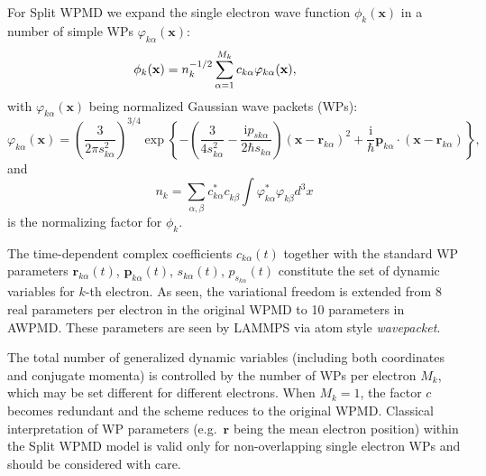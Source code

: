 \documentclass[a4paper,12pt]{article}
\begin{document}
For Split WPMD we expand the single electron wave function $\phi_k(\mathbf{x})$
in a number of simple WPs $\varphi_{k\alpha}(\mathbf{x})$:
\begin{equation}\label{WPdef}
\hspace*{-30pt}
\phi_k(\mathbf{x})
= n_k^{-1/2}\sum_{\alpha=1}^{M_k} c_{k\alpha} \varphi_{k\alpha}(\mathbf{x}),
\end{equation}
with $\varphi_{k\alpha}(\mathbf{x})$ being normalized Gaussian wave packets (WPs):
\begin{equation}
\varphi_{k\alpha}(\mathbf{x}) = \left( \frac{3}{2\pi s_{k\alpha}^2} \right)^{3/4}
\exp \left\{
- \left(\frac{3}{4s_{k\alpha}^2} - \frac{\mathrm{i}{p_{sk\alpha}}}{2\hbar s_{k\alpha}} \right)
(\mathbf{x}-\mathbf{r}_{k\alpha})^2 + \frac{\mathrm{i}}{\hbar}{\mathbf{p}_{k\alpha}} \cdot (\mathbf{x}-\mathbf{r}_{k\alpha})
\right\},
\end{equation}
and
\begin{equation}
n_k=\sum_{\alpha,\beta} c^*_{k\alpha}
c^{}_{k\beta}\int\varphi^*_{k\alpha}\varphi^{}_{k\beta}d^3x
\end{equation}
is the normalizing factor for $\phi_k$.

The time-dependent complex coefficients $c_{k\alpha}(t)$
together with the standard WP parameters $\mathbf{r}_{k\alpha}(t)$,
$\mathbf{p}_{k\alpha}(t)$, $s_{k\alpha}(t)$, $p_{s_{k\alpha}}(t)$ constitute
the set of dynamic variables for $k$-th electron. As seen,  the variational freedom is extended from 8 real parameters per electron in the original WPMD to 10 parameters in AWPMD. These parameters are seen by LAMMPS via atom style \textsl{wavepacket}.

The total number of generalized dynamic variables (including both coordinates and conjugate momenta)  is controlled by the number of WPs per
electron $M_k$, which may be set different for different electrons. When
$M_k=1$, the factor $c$ becomes redundant and the scheme reduces to the
original WPMD. Classical interpretation of WP parameters
(e.g.\ $\mathbf{r}$ being the mean electron position) 
within the Split WPMD model is valid only for 
non-overlapping single electron WPs and should be considered with care.
\end{document}
